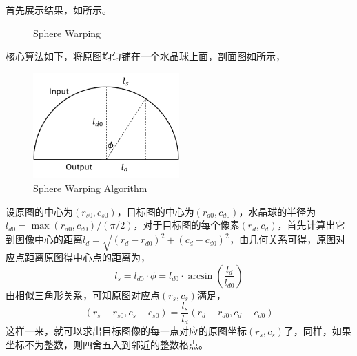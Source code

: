 \documentclass[12pt,a4paper]{article}
\begin{document}
首先展示结果，如所示。
\begin{figure}[H]
    \centering
    \caption{Sphere Warping}
    \label{fig:sphere}
\end{figure}

核心算法如下，将原图均匀铺在一个水晶球上面，剖面图如所示，
\begin{figure}[H]
    \centering
    \includegraphics[width=0.5\textwidth]{fig/sphere.pdf}
    \caption{Sphere Warping Algorithm}
    \label{fig:sphere_alg}
\end{figure}
设原图的中心为$(r_{s0}, c_{s0})$，目标图的中心为$(r_{d0}, c_{d0})$，水晶球的半径为$l_{d0} = \max(r_{d0}, c_{d0}) / (\pi / 2)$，对于目标图的每个像素$(r_d, c_d)$，首先计算出它到图像中心的距离$l_d= \sqrt{(r_d - r_{d0})^2 + (c_d - c_{d0})^2}$，由几何关系可得，原图对应点距离原图得中心点的距离为，
\begin{equation}
    l_s = l_{d0} \cdot \phi = l_{d0} \cdot \arcsin\left(\frac{l_d}{l_{d0}}\right)
\end{equation}
由相似三角形关系，可知原图对应点$(r_s, c_s)$满足，
\begin{equation}
    (r_s - r_{s0}, c_s - c_{s0}) = \frac{l_s}{l_d} (r_d - r_{d0}, c_d - c_{d0})
\end{equation}
这样一来，就可以求出目标图像的每一点对应的原图坐标$(r_s, c_s)$了，同样，如果坐标不为整数，则四舍五入到邻近的整数格点。
\end{document}
